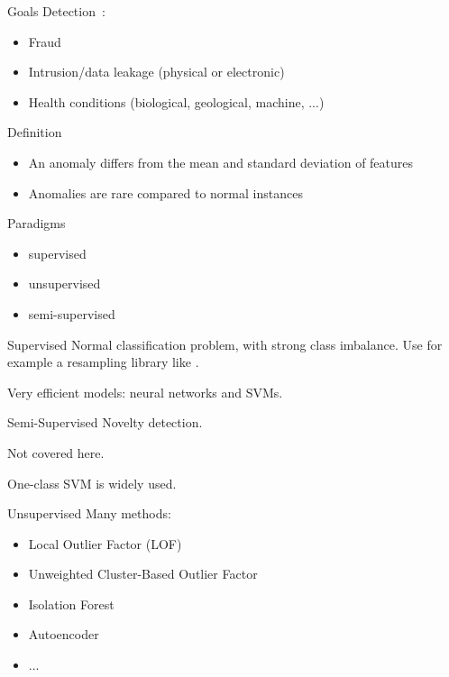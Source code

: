 \begin{frame}{Goals}
  Detection~:
  \begin{itemize}
  \item Fraud
  \item Intrusion/data leakage (physical or electronic)
  \item Health conditions (biological, geological, machine, ...)
  \end{itemize}
\end{frame}

\begin{frame}{Definition}
  \begin{itemize}
  \item An anomaly differs from the mean and standard deviation of features
  \item Anomalies are rare compared to normal instances
  \end{itemize}
\end{frame}

\begin{frame}{Paradigms}
  \begin{itemize}
    \item supervised
    \item unsupervised
    \item semi-supervised
  \end{itemize}
\end{frame}

\begin{frame}{Supervised}
  Normal classification problem, with strong class imbalance.
  Use for example a resampling library like .

  Very efficient models: neural networks and SVMs.
\end{frame}

\begin{frame}{Semi-Supervised}
  Novelty detection.

  Not covered here.

  One-class SVM is widely used.
\end{frame}

\begin{frame}{Unsupervised}
  Many methods: 
  \begin{itemize}
  \item Local Outlier Factor (LOF)
  \item Unweighted Cluster-Based Outlier Factor
  \item Isolation Forest
  \item Autoencoder
  \item ...
  \end{itemize}
\end{frame}


